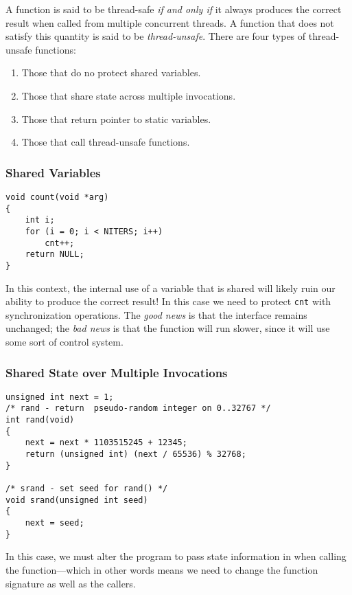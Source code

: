 \documentclass[fleqn]{article}
\begin{document}
A function is said to be thread-safe \textit{if and only if} it always produces the correct result when called from multiple concurrent threads. A function that does not satisfy this quantity is said to be \textit{thread-unsafe}. There are four types of thread-unsafe functions:

\begin{enumerate}
\item Those that do no protect shared variables.

\item Those that share state across multiple invocations.

\item Those that return pointer to static variables.

\item Those that call thread-unsafe functions.
\end{enumerate}

\subsubsection{Shared Variables}

\begin{verbatim}
void count(void *arg)
{
    int i;
    for (i = 0; i < NITERS; i++)
        cnt++;
    return NULL;
}
\end{verbatim}

In this context, the internal use of a variable that is shared will likely ruin our ability to produce the correct result! In this case we need to protect \texttt{cnt} with synchronization operations. The \textit{good news} is that the interface remains unchanged; the \textit{bad news} is that the function will run slower, since it will use some sort of control system.

\subsubsection{Shared State over Multiple Invocations}

\begin{verbatim}
unsigned int next = 1;
/* rand - return  pseudo-random integer on 0..32767 */
int rand(void)
{
    next = next * 1103515245 + 12345;
    return (unsigned int) (next / 65536) % 32768;
}

/* srand - set seed for rand() */
void srand(unsigned int seed)
{
    next = seed;
}
\end{verbatim}

In this case, we must alter the program to pass state information in when calling the function---which in other words means we need to change the function signature as well as the callers.
\end{document}
